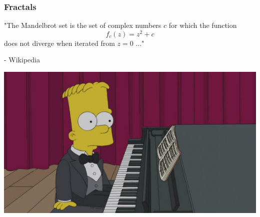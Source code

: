\documentclass{beamer}
\theoremstyle{mystyle}
\begin{document}
\begin{frame}
\frametitle{Fractals}

\begin{center}
"The Mandelbrot set is the set of complex numbers $c$ for which the function
\[ f_c(z) = z^2 + c\]
does not diverge when iterated from $z = 0$ ..."
\end{center} 
\hspace{3in}- Wikipedia

\pause 

\begin{center}
	\includegraphics[scale=0.3]{bart}
\end{center}

\end{frame}
\end{document}
